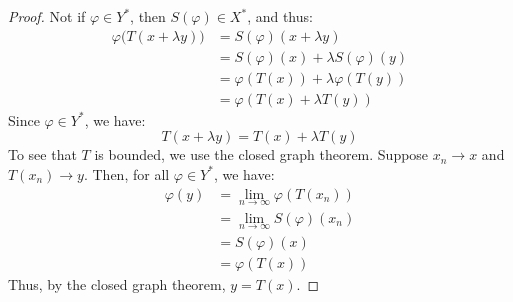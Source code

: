 \documentclass[crop=false,class=book,oneside]{standalone}                      %
\begin{document}
        \begin{proof}
            Not if $\varphi\in{Y}^{*}$, then $S(\varphi)\in{X}^{*}$,
            and thus:
            \begin{subequations}
                \begin{align}
                    \varphi\big(T(x+\lambda{y})\big)&=
                    S(\varphi)(x+\lambda{y})\\
                    &=S(\varphi)(x)+\lambda{S}(\varphi)(y)\\
                    &=\varphi(T(x))+\lambda\varphi(T(y))\\
                    &=\varphi(T(x)+\lambda{T}(y))
                \end{align}
            \end{subequations}
            Since $\varphi\in{Y}^{*}$, we have:
            \begin{equation}
                T(x+\lambda{y})=T(x)+\lambda{T}(y)
            \end{equation}
            To see that $T$ is bounded, we use the closed graph
            theorem. Suppose $x_{n}\rightarrow{x}$ and
            $T(x_{n})\rightarrow{y}$. Then, for all
            $\varphi\in{Y}^{*}$, we have:
            \begin{subequations}
                \begin{align}
                    \varphi(y)&=\underset{n\rightarrow\infty}{\lim}
                        \varphi(T(x_{n}))\\
                        &=\underset{n\rightarrow\infty}{\lim}
                        S(\varphi)(x_{n})\\
                        &=S(\varphi)(x)\\
                        &=\varphi(T(x))
                \end{align}
            \end{subequations}
            Thus, by the closed graph theorem, $y=T(x)$.
        \end{proof}
\end{document}
